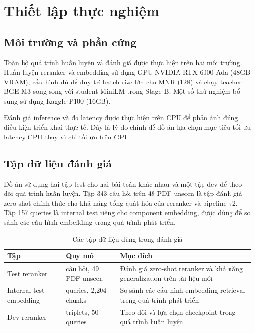 \documentclass[../DoAn.tex]{subfiles}
\begin{document}
\section{Thiết lập thực nghiệm}
\label{section:5.1}

\subsection{Môi trường và phần cứng}
\label{subsection:5.1.1}

Toàn bộ quá trình huấn luyện và đánh giá được thực hiện trên hai môi trường. Huấn luyện reranker và embedding sử dụng GPU NVIDIA RTX 6000 Ada (48GB VRAM), cấu hình đủ để duy trì batch size lớn cho MNR (128) và chạy teacher BGE-M3 song song với student MiniLM trong Stage B. Một số thử nghiệm bổ sung sử dụng Kaggle P100 (16GB).

Đánh giá inference và đo latency được thực hiện trên CPU để phản ánh đúng điều kiện triển khai thực tế. Đây là lý do chính để đồ án lựa chọn mục tiêu tối ưu latency CPU thay vì chỉ tối ưu trên GPU.

\subsection{Tập dữ liệu đánh giá}
\label{subsection:5.1.2}

Đồ án sử dụng hai tập test cho hai bài toán khác nhau và một tập dev để theo dõi quá trình huấn luyện. Tập 343 câu hỏi trên 49 PDF unseen là tập đánh giá zero-shot chính thức cho khả năng tổng quát hóa của reranker và pipeline v2. Tập 157 queries là internal test riêng cho component embedding, được dùng để so sánh các cấu hình embedding trong quá trình phát triển.

\begin{table}[H]
    \centering
    \caption{Các tập dữ liệu dùng trong đánh giá}
    \label{tab:evaluation-datasets}
    {\small
    \setlength{\tabcolsep}{5pt}
    \begin{tabular}{|>{\raggedright\arraybackslash}p{3.2cm}|>{\raggedright\arraybackslash}p{4.1cm}|>{\raggedright\arraybackslash}p{6.0cm}|}
        \hline
        \textbf{Tập} & \textbf{Quy mô} & \textbf{Mục đích} \\ \hline
        Test reranker & 343 câu hỏi, 49 PDF unseen & Đánh giá zero-shot reranker và khả năng generalization trên tài liệu mới \\ \hline
        Internal test embedding & 157 queries, 2,204 chunks & So sánh các cấu hình embedding retrieval trong quá trình phát triển \\ \hline
        Dev reranker & 305 triplets, 50 queries & Theo dõi và lựa chọn checkpoint trong quá trình huấn luyện \\ \hline
    \end{tabular}
    }
\end{table}
\end{document}
